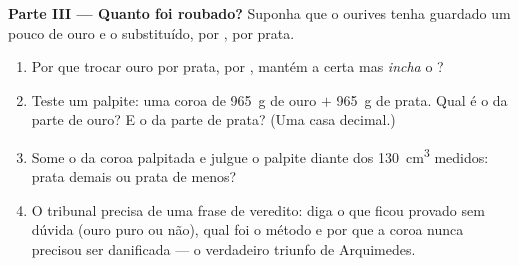 \begin{problem}
\medskip\noindent\textbf{Parte III --- Quanto foi roubado?}
Suponha que o ourives tenha guardado um pouco de ouro e o substituído,
 por , por prata.
\begin{enumerate}[resume]
  \item Por que trocar ouro por prata,  por , mantém a
         certa mas \emph{incha} o ?
  \item Teste um palpite: uma coroa de \qty{965}{g} de ouro $+$
        \qty{965}{g} de prata. Qual é o  da parte de ouro? E o
        da parte de prata? (Uma casa decimal.)
  \item Some o  da coroa palpitada e julgue o palpite diante
        dos \qty{130}{cm^3} medidos: prata demais ou prata de menos?
  \item O tribunal precisa de uma frase de veredito: diga o que ficou
        provado sem dúvida (ouro puro ou não), qual foi o método e
        por que a coroa nunca precisou ser danificada --- o
        verdadeiro triunfo de Arquimedes.
\end{enumerate}
\end{problem}
